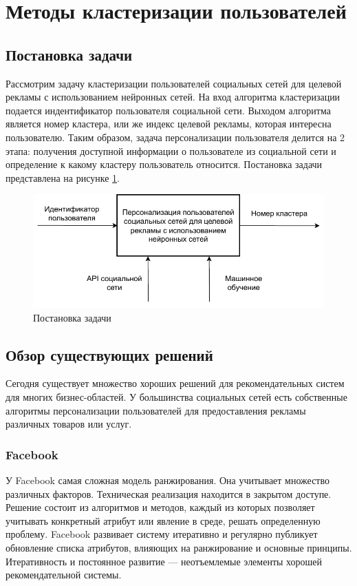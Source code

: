 \section{Методы кластеризации пользователей}

\subsection{Постановка задачи}

Рассмотрим задачу кластеризации пользователей социальных сетей для целевой рекламы с использованием нейронных сетей. На вход алгоритма кластеризации подается индентификатор пользователя социальной сети. Выходом алгоритма является номер кластера, или же индекс целевой рекламы, которая интересна пользователю. Таким образом, задача персонализации пользователя делится на 2 этапа: получения доступной информации о пользователе из социальной сети и определение к какому кластеру пользователь относится. Постановка задачи представлена на рисунке \ref{fig:a0}.

\begin{figure}[hbtp]
	\centering
	\includegraphics[scale=0.8]{img/a0.pdf}
	\caption{Постановка задачи}
	\label{fig:a0}
\end{figure}

\subsection{Обзор существующих решений}

Сегодня существует множество хороших решений для рекомендательных систем для многих бизнес-областей. У большинства социальных сетей есть собственные алгоритмы персонализации пользователей для предоставления рекламы различных товаров или услуг. 

\subsubsection{Facebook}
У Facebook самая сложная модель ранжирования. Она учитывает множество различных факторов. Техническая реализация находится в закрытом доступе. Решение состоит из алгоритмов и методов, каждый из которых позволяет учитывать конкретный атрибут или явление в среде, решать определенную проблему. Facebook развивает систему итеративно и регулярно публикует обновление списка атрибутов, влияющих на ранжирование и основные принципы. Итеративность и постоянное развитие — неотъемлемые элементы хорошей рекомендательной системы.

